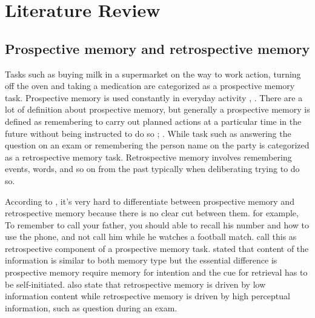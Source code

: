 
\chapter{Literature Review}
\section{Prospective memory and retrospective memory}

Tasks such as buying milk in a supermarket on the way to work action, turning off the oven and taking a medication are categorized as a prospective memory task. Prospective memory is used constantly in everyday activity \citep{gruneberAndMoris1978}, \citep{cohen1989}.
There are a lot of definition about prospective memory, but generally  a prospective memory is defined as remembering to carry out planned actions at a particular time in the future without being instructed to do so \citep{mcdaniel2007prospective}; \citep{GROOT2002}. While task such as answering the question on an exam or remembering the person name on the party is categorized as a retrospective memory task.
Retrospective memory involves remembering events, words, and so on from the past typically
when deliberating trying to do so.




According to \cite{BaddeleyWilkins1983}, it's very hard to differentiate between prospective memory and retrospective memory because there is no clear cut between them. for example, To remember to call your father, you should able to recall his number and how to use the phone, and not call him while he watches a football match. \cite{brandimonte1996prospective} call this as retrospective component of a prospective memory task.
\cite{CockburnJ.1995Tiip} stated that content of the information is similar to both memory type but the essential difference is prospective memory require memory for intention and the cue for retrieval has to be self-initiated.
\cite{GuynnMelissaJ.1998PMWR} also state that retrospective memory is driven by low information content while retrospective memory is driven by high perceptual information, such as question during an exam.

